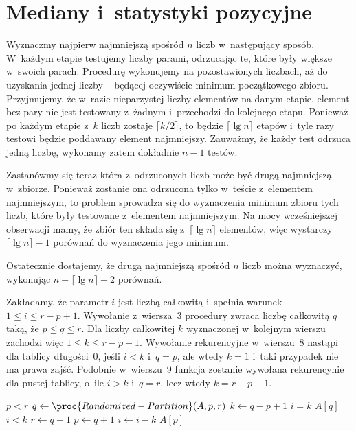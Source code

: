 \chapter{Mediany i~statystyki pozycyjne}


\exercise %
Wyznaczmy najpierw najmniejszą spośród $n$ liczb w~następujący sposób. W~każdym etapie testujemy liczby parami, odrzucając te, które były większe w~swoich parach. Procedurę wykonujemy na pozostawionych liczbach, aż do uzyskania jednej liczby -- będącej oczywiście minimum początkowego zbioru. Przyjmujemy, że w~razie nieparzystej liczby elementów na danym etapie, element bez pary nie jest testowany z~żadnym i~przechodzi do kolejnego etapu. Ponieważ po każdym etapie z~$k$ liczb zostaje $\lceil k/2\rceil$, to będzie $\lceil\lg n\rceil$ etapów i~tyle razy testowi będzie poddawany element najmniejszy. Zauważmy, że każdy test odrzuca jedną liczbę, wykonamy zatem dokładnie $n-1$ testów.

Zastanówmy się teraz która z~odrzuconych liczb może być drugą najmniejszą w~zbiorze. Ponieważ zostanie ona odrzucona tylko w~teście z~elementem najmniejszym, to problem sprowadza się do wyznaczenia minimum zbioru tych liczb, które były testowane z~elementem najmniejszym. Na mocy wcześniejszej obserwacji mamy, że zbiór ten składa się z~$\lceil\lg n\rceil$ elementów, więc wystarczy $\lceil\lg n\rceil-1$ porównań do wyznaczenia jego minimum.

Ostatecznie dostajemy, że drugą najmniejszą spośród $n$ liczb można wyznaczyć, wykonując $n+\lceil\lg n\rceil-2$ porównań.

\exercise %


\exercise %
Zakładamy, że parametr $i$ jest liczbą całkowitą i~spełnia warunek $1\le i\le r-p+1$. Wywołanie z~wiersza~3 procedury  zwraca liczbę całkowitą $q$ taką, że $p\le q\le r$. Dla liczby całkowitej $k$ wyznaczonej w~kolejnym wierszu zachodzi więc $1\le k\le r-p+1$. Wywołanie rekurencyjne w~wierszu~8 nastąpi dla tablicy długości~0, jeśli $i<k$ i~$q=p$, ale wtedy $k=1$ i~taki przypadek nie ma prawa zajść. Podobnie w~wierszu~9 funkcja zostanie wywołana rekurencynie dla pustej tablicy, o~ile $i>k$ i~$q=r$, lecz wtedy $k=r-p+1$.

\exercise %

\exercise %
\begin{codebox}
\li	\While $p<r$
\li		\Do
			$q\gets\proc{Randomized-Partition}(A,p,r)$
\li			$k\gets q-p+1$
\li			\If $i=k$
\li				\Then \Return $A[q]$
\li			\ElseIf $i<k$
\li				\Then $r\gets q-1$
\li			\ElseNoIf
				$p\gets q+1$
\li				$i\gets i-k$
				\End
		\End
\li	\Return $A[p]$
\end{codebox}

